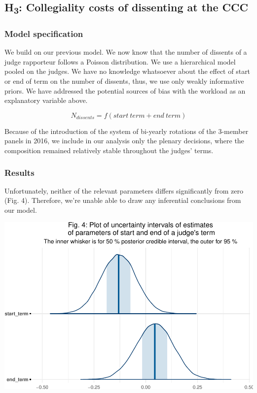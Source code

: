 \documentclass[
  11pt,
]{article}
\begin{document}
\hypertarget{h3-collegiality-costs-of-dissenting-at-the-ccc}{%
\subsection{\texorpdfstring{H\textsubscript{3}: Collegiality costs of
dissenting at the
CCC}{H3: Collegiality costs of dissenting at the CCC}}\label{h3-collegiality-costs-of-dissenting-at-the-ccc}}

\hypertarget{model-specification-2}{%
\subsubsection{Model specification}\label{model-specification-2}}

We build on our previous model. We now know that the number of dissents
of a judge rapporteur follows a Poisson distribution. We use a
hierarchical model pooled on the judges. We have no knowledge whatsoever
about the effect of start or end of term on the number of dissents,
thus, we use only weakly informative priors. We have addressed the
potential sources of bias with the workload as an explanatory variable
above.

\[
N_{dissents} = f(start\:term + end\:term)
\]

Because of the introduction of the system of bi-yearly rotations of the
3-member panels in 2016, we include in our analysis only the plenary
decisions, where the composition remained relatively stable throughout
the judges' terms.

\hypertarget{results-1}{%
\subsubsection{Results}\label{results-1}}

Unfortunately, neither of the relevant parameters differs significantly
from zero (Fig. 4). Therefore, we're unable able to draw any inferential
conclusions from our model.

\vspace{25pt}

\includegraphics{dissents_article_anonymised_files/figure-latex/interpreting_posterior_term2-1.pdf}
\vspace{25pt}
\end{document}
